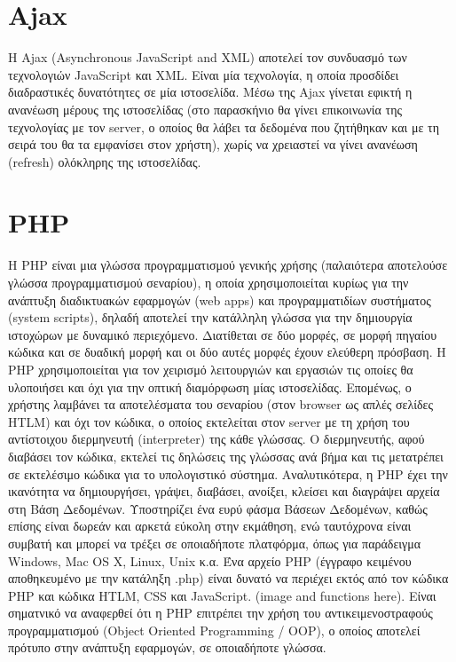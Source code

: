 \section{Ajax}
Η Ajax (Asynchronous JavaScript and XML) αποτελεί τον συνδυασμό των τεχνολογιών JavaScript και XML. Είναι μία τεχνολογία, η οποία προσδίδει διαδραστικές δυνατότητες σε μία ιστοσελίδα. Μέσω της Ajax γίνεται εφικτή η ανανέωση μέρους της ιστοσελίδας (στο παρασκήνιο θα γίνει επικοινωνία της τεχνολογίας με τον server, ο οποίος θα λάβει τα δεδομένα που ζητήθηκαν και με τη σειρά του θα τα εμφανίσει στον χρήστη), χωρίς να χρειαστεί να γίνει ανανέωση (refresh) ολόκληρης της ιστοσελίδας.

\section{PHP}
Η PHP είναι μια γλώσσα προγραμματισμού γενικής χρήσης (παλαιότερα αποτελούσε γλώσσα προγραμματισμού σεναρίου), η οποία χρησιμοποιείται κυρίως για την ανάπτυξη διαδικτυακών εφαρμογών (web apps) και προγραμματιδίων συστήματος (system scripts), δηλαδή αποτελεί την κατάλληλη γλώσσα για την δημιουργία ιστοχώρων με δυναμικό περιεχόμενο. Διατίθεται σε δύο μορφές, σε μορφή πηγαίου κώδικα και σε δυαδική μορφή και οι δύο αυτές μορφές έχουν ελεύθερη πρόσβαση. Η PHP χρησιμοποιείται για τον χειρισμό λειτουργιών και εργασιών τις οποίες θα υλοποιήσει και όχι για την οπτική διαμόρφωση μίας ιστοσελίδας. Επομένως, ο χρήστης λαμβάνει τα αποτελέσματα του σεναρίου (στον browser ως απλές σελίδες HTLM) και όχι τον κώδικα, ο οποίος εκτελείται στον server με τη χρήση του αντίστοιχου διερμηνευτή (interpreter) της κάθε γλώσσας. Ο διερμηνευτής, αφού διαβάσει τον κώδικα, εκτελεί τις δηλώσεις της γλώσσας ανά βήμα και τις μετατρέπει σε εκτελέσιμο κώδικα για το υπολογιστικό σύστημα. Αναλυτικότερα, η PHP έχει την ικανότητα να δημιουργήσει, γράψει, διαβάσει, ανοίξει, κλείσει και διαγράψει αρχεία στη Βάση Δεδομένων. Υποστηρίζει ένα ευρύ φάσμα Βάσεων Δεδομένων, καθώς επίσης είναι δωρεάν και αρκετά εύκολη στην εκμάθηση, ενώ ταυτόχρονα είναι συμβατή και μπορεί να τρέξει σε οποιαδήποτε πλατφόρμα, όπως για παράδειγμα Windows, Mac OS X, Linux, Unix κ.α. Ένα αρχείο PHP (έγγραφο κειμένου αποθηκευμένο με την κατάληξη .php) είναι δυνατό να περιέχει εκτός από τον κώδικα PHP και κώδικα HTLM, CSS και JavaScript. (image and functions here). Είναι σηματνικό να αναφερθεί ότι η PHP επιτρέπει την χρήση του αντικειμενοστραφούς προγραμματισμού (Object Oriented Programming / OOP), ο οποίος αποτελεί πρότυπο στην ανάπτυξη εφαρμογών, σε οποιαδήποτε γλώσσα.
